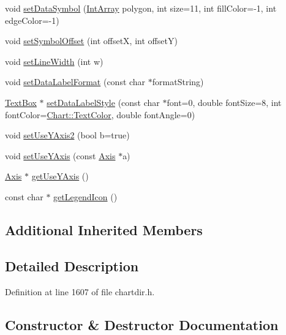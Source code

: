 \begin{DoxyCompactItemize}
\item 
void \hyperlink{class_data_set_a5950da227229ddc6e9bc900830525f9e}{set\+Data\+Symbol} (\hyperlink{class_int_array}{Int\+Array} polygon, int size=11, int fill\+Color=-\/1, int edge\+Color=-\/1)
\item 
void \hyperlink{class_data_set_a943a5f94f0f09001f20318bdff3936a5}{set\+Symbol\+Offset} (int offsetX, int offsetY)
\item 
void \hyperlink{class_data_set_a6435ee82c7223faf3547cff475db3632}{set\+Line\+Width} (int w)
\item 
void \hyperlink{class_data_set_a009504918f4973a74b36cb80ee219644}{set\+Data\+Label\+Format} (const char $\ast$format\+String)
\item 
\hyperlink{class_text_box}{Text\+Box} $\ast$ \hyperlink{class_data_set_afecb7de8fdcaaa31e46e7ae6181a18f8}{set\+Data\+Label\+Style} (const char $\ast$font=0, double font\+Size=8, int font\+Color=\hyperlink{namespace_chart_abee0d882fdc9ad0b001245ad9fc64011a879e14f2f5024caccc047374342321ef}{Chart\+::\+Text\+Color}, double font\+Angle=0)
\item 
void \hyperlink{class_data_set_a012ae8bc45533d67340c82a82b2f7f92}{set\+Use\+Y\+Axis2} (bool b=true)
\item 
void \hyperlink{class_data_set_a513df1915a715e378637ac4171c53a58}{set\+Use\+Y\+Axis} (const \hyperlink{class_axis}{Axis} $\ast$a)
\item 
\hyperlink{class_axis}{Axis} $\ast$ \hyperlink{class_data_set_aa57e5e6fe299e68f398ef304944bbf47}{get\+Use\+Y\+Axis} ()
\item 
const char $\ast$ \hyperlink{class_data_set_ab4d4572923940e112a3b4d50da670854}{get\+Legend\+Icon} ()
\end{DoxyCompactItemize}
\subsection*{Additional Inherited Members}


\subsection{Detailed Description}


Definition at line 1607 of file chartdir.\+h.



\subsection{Constructor \& Destructor Documentation}
\mbox{\label{class_data_set_a142cf87cf1c386949feddf19d446a19a}} 
